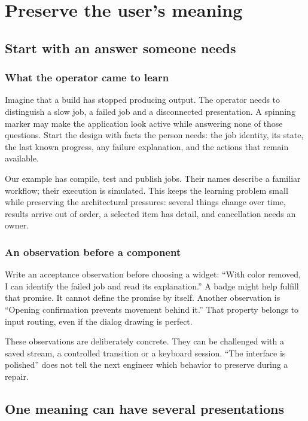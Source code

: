 \chapter{Preserve the user's meaning}\label{teaching-meaning}

\section{Start with an answer someone needs}
\subsection{What the operator came to learn}

Imagine that a build has stopped producing output. The operator needs to distinguish a slow job, a failed job and a disconnected presentation. A spinning marker may make the application look active while answering none of those questions. Start the design with facts the person needs: the job identity, its state, the last known progress, any failure explanation, and the actions that remain available.

Our example has compile, test and publish jobs. Their names describe a familiar workflow; their execution is simulated. This keeps the learning problem small while preserving the architectural pressures: several things change over time, results arrive out of order, a selected item has detail, and cancellation needs an owner.

\subsection{An observation before a component}

Write an acceptance observation before choosing a widget: ``With color removed, I can identify the failed job and read its explanation.'' A badge might help fulfill that promise. It cannot define the promise by itself. Another observation is ``Opening confirmation prevents movement behind it.'' That property belongs to input routing, even if the dialog drawing is perfect.

These observations are deliberately concrete. They can be challenged with a saved stream, a controlled transition or a keyboard session. ``The interface is polished'' does not tell the next engineer which behavior to preserve during a repair.

\section{One meaning can have several presentations}
